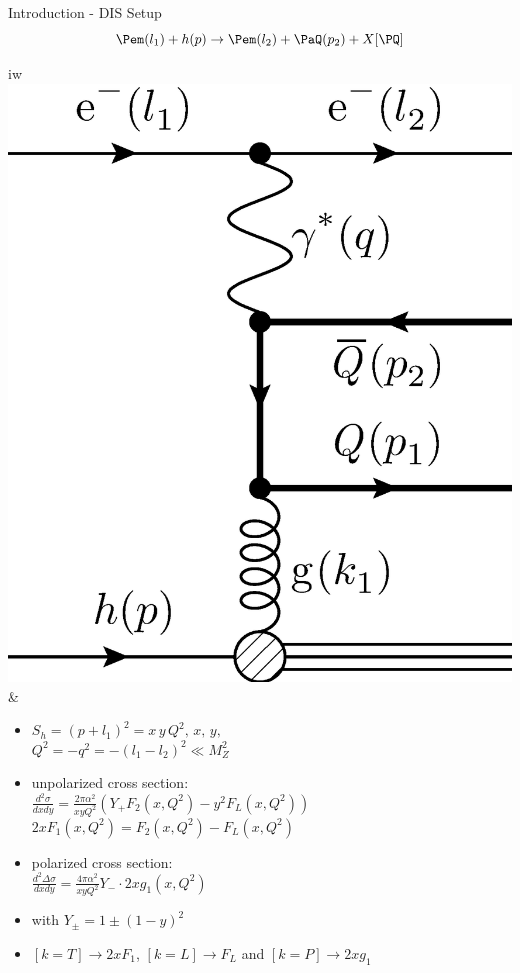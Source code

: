 \begin{frame}{Introduction - DIS Setup}
\[\Pem(l_1)+h(p) \to \Pem(l_2) + \PaQ(p_2) + X[\PQ]\]
\hspace{-.5cm}\begin{tabular}{iw}
\includegraphics[width=.25\textwidth]{img/DIS.eps} &
\begin{itemize}
\item $S_h = (p+l_1)^2 = x\,y\,Q^2,\,x,\,y,$\\
$Q^2 = -q^2 = - (l_1-l_2)^2 \ll M_Z^2$
\item unpolarized cross section:\\
$\frac{d^2\sigma}{dx dy} = \frac{2\pi \alpha^2}{x y Q^2}\left(Y_+F_2(x,Q^2) - y^2F_L(x,Q^2)\right)$\\
$2xF_1(x,Q^2) = F_2(x,Q^2) - F_L(x,Q^2)$
\item polarized cross section:\\
$\frac{d^2\Delta\sigma}{dx dy} = \frac{4\pi \alpha^2}{x y Q^2}Y_-\cdot 2xg_1(x,Q^2)$
\item with $Y_\pm = 1 \pm (1-y)^2$
\item $[k=T]\to 2xF_1$, $[k=L]\to F_L$ and $[k=P]\to 2xg_1$
\end{itemize}
\end{tabular}
\end{frame}

